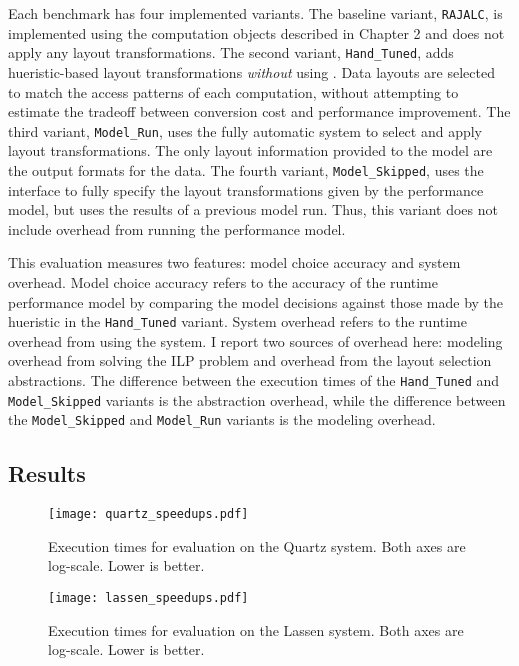 Each benchmark has four implemented variants. 
The baseline variant, \verb.RAJALC., is implemented using the computation objects described in Chapter 2 and does not apply any layout transformations.
The second variant, \verb.Hand_Tuned., adds hueristic-based layout transformations \textit{without} using \FormatDecisions{}.
Data layouts are selected to match the access patterns of each computation, without attempting to estimate the tradeoff between conversion cost and performance improvement.
The third variant, \verb.Model_Run., uses the fully automatic \FormatDecisions{} system to select and apply layout transformations.
The only layout information provided to the model are the output formats for the data.
The fourth variant, \verb.Model_Skipped., uses the \FormatDecisions{} interface to fully specify the layout transformations given by the performance model, but uses the results of a previous model run.
Thus, this variant does not include overhead from running the performance model.

This evaluation measures two features: model choice accuracy and system overhead.
Model choice accuracy refers to the accuracy of the runtime performance model by comparing the model decisions against those made by the hueristic in the \verb.Hand_Tuned. variant.
System overhead refers to the runtime overhead from using the \FormatDecisions{} system.
I report two sources of overhead here: modeling overhead from solving the ILP problem and overhead from the layout selection abstractions.
The difference between the execution times of the \verb.Hand_Tuned. and \verb.Model_Skipped. variants is the abstraction overhead, while the difference between the \verb.Model_Skipped. and \verb.Model_Run. variants is the modeling overhead.

\subsection{Results}
\begin{figure}
\texttt{[image: quartz\_speedups.pdf]}
\caption{Execution times for evaluation on the Quartz system. Both axes are log-scale. Lower is better.}
\label{quartzSpeedups}
\end{figure}

\begin{figure}
\texttt{[image: lassen\_speedups.pdf]}
\caption{Execution times for evaluation on the Lassen system. Both axes are log-scale. Lower is better.}
\label{lassenSpeedups}
\end{figure}

